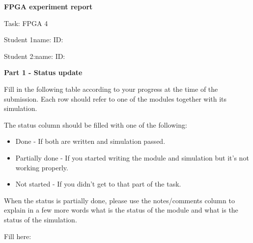 \documentclass[11pt,a4paper]{article}
\newcommand{\fillin}[1]{\underline{\hspace{#1}}}
\begin{document}
\begin{center}
  {\fontsize{22}{26}\selectfont \textbf{FPGA experiment report}}
\end{center}

\vspace{0.5em}
Task: FPGA 4

\vspace{1em}
Student 1\hspace{1.5em}name: \fillin{4cm}\hspace{1.5em}ID: \fillin{3cm}

Student 2:\hspace{1.5em}name: \fillin{4cm}\hspace{1.5em}ID: \fillin{3cm}

\vspace{1.5em}

{\fontsize{14}{17}\selectfont \textbf{Part 1 - Status update}}

\vspace{0.5em}
Fill in the following table according to your progress at the time of the submission.
Each row should refer to one of the modules together with its simulation.

The status column should be filled with one of the following:
\begin{itemize}[noitemsep,topsep=2pt]
  \item Done - If both are written and simulation passed.
  \item Partially done - If you started writing the module and simulation but it's not working properly.
  \item Not started - If you didn't get to that part of the task.
\end{itemize}

When the status is partially done, please use the notes/comments column to explain in a few more words what is the status of the module and what is the status of the simulation.

\vspace{0.5em}
Fill here:
\end{document}
